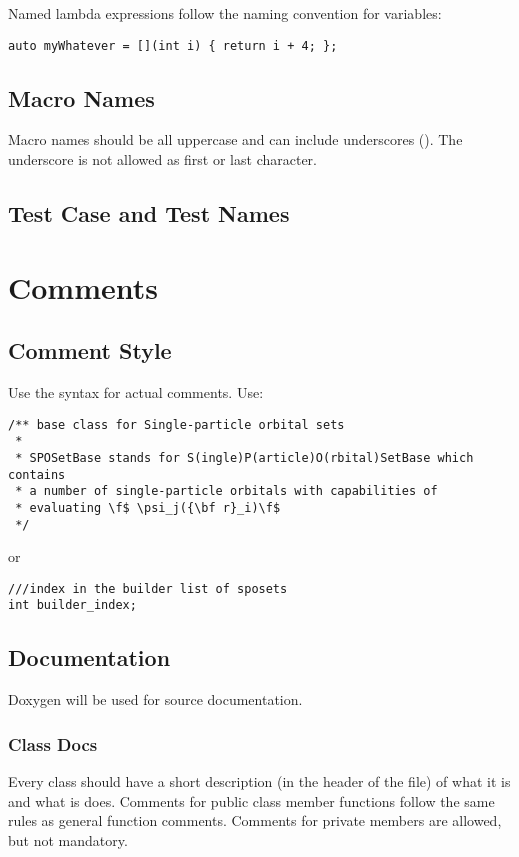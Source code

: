 Named lambda expressions follow the naming convention for variables:

\begin{lstlisting}[showspaces=false]
auto myWhatever = [](int i) { return i + 4; };
\end{lstlisting}

\subsection{Macro Names}

Macro names should be all uppercase and can include underscores (\inlinecode{_}).
The underscore is not allowed as first or last character.

\subsection{Test Case and Test Names}

\section{Comments}

\subsection{Comment Style}

Use the  syntax for actual comments.
Use:
\begin{lstlisting}
/** base class for Single-particle orbital sets
 *
 * SPOSetBase stands for S(ingle)P(article)O(rbital)SetBase which contains
 * a number of single-particle orbitals with capabilities of
 * evaluating \f$ \psi_j({\bf r}_i)\f$
 */
\end{lstlisting}
or
\begin{lstlisting}
///index in the builder list of sposets
int builder_index;
\end{lstlisting}

\subsection{Documentation}
Doxygen will be used for source documentation.

\subsubsection{Class Docs}
Every class should have a short description (in the header of the file) of what it is and what is does.
Comments for public class member functions follow the same rules as general function comments.
Comments for private members are allowed, but not mandatory.

